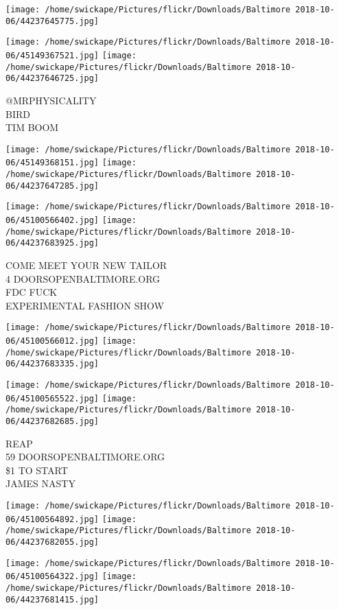\documentclass[10pt,letterpaper]{article}
\begin{document}
\texttt{[image: /home/swickape/Pictures/flickr/Downloads/Baltimore 2018-10-06/44237645775.jpg]}

\vspace{0.25in}
\texttt{[image: /home/swickape/Pictures/flickr/Downloads/Baltimore 2018-10-06/45149367521.jpg]}
\texttt{[image: /home/swickape/Pictures/flickr/Downloads/Baltimore 2018-10-06/44237646725.jpg]}

@MRPHYSICALITY\\
BIRD\\
TIM BOOM\\
\pagebreak

\texttt{[image: /home/swickape/Pictures/flickr/Downloads/Baltimore 2018-10-06/45149368151.jpg]}
\texttt{[image: /home/swickape/Pictures/flickr/Downloads/Baltimore 2018-10-06/44237647285.jpg]}

\texttt{[image: /home/swickape/Pictures/flickr/Downloads/Baltimore 2018-10-06/45100566402.jpg]}
\texttt{[image: /home/swickape/Pictures/flickr/Downloads/Baltimore 2018-10-06/44237683925.jpg]}

COME MEET YOUR NEW TAILOR\\
4 DOORSOPENBALTIMORE.ORG\\
FDC FUCK\\
EXPERIMENTAL FASHION SHOW\\
\pagebreak

\texttt{[image: /home/swickape/Pictures/flickr/Downloads/Baltimore 2018-10-06/45100566012.jpg]}
\texttt{[image: /home/swickape/Pictures/flickr/Downloads/Baltimore 2018-10-06/44237683335.jpg]}

\texttt{[image: /home/swickape/Pictures/flickr/Downloads/Baltimore 2018-10-06/45100565522.jpg]}
\texttt{[image: /home/swickape/Pictures/flickr/Downloads/Baltimore 2018-10-06/44237682685.jpg]}

REAP\\
59 DOORSOPENBALTIMORE.ORG\\
\$1 TO START\\
JAMES NASTY\\
\pagebreak

\texttt{[image: /home/swickape/Pictures/flickr/Downloads/Baltimore 2018-10-06/45100564892.jpg]}
\texttt{[image: /home/swickape/Pictures/flickr/Downloads/Baltimore 2018-10-06/44237682055.jpg]}

\texttt{[image: /home/swickape/Pictures/flickr/Downloads/Baltimore 2018-10-06/45100564322.jpg]}
\texttt{[image: /home/swickape/Pictures/flickr/Downloads/Baltimore 2018-10-06/44237681415.jpg]}
\end{document}
